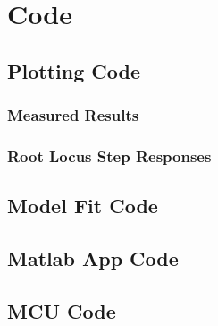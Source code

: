 \section{Code}

\subsection{Plotting Code}
\subsubsection{Measured Results}


\subsubsection{Root Locus Step Responses}


\subsection{Model Fit Code}


\subsection{Matlab App Code}


\subsection{MCU Code}
